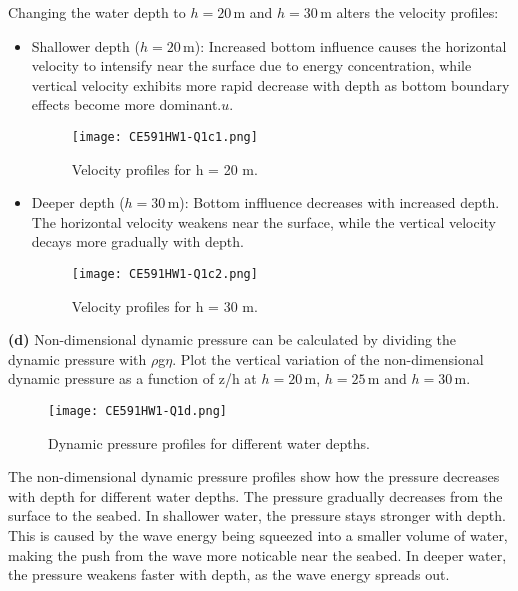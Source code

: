 \documentclass[a4paper]{article}
\begin{document}
Changing the water depth to \( h = 20 \, \text{m} \) and \( h = 30 \, \text{m} \) alters the velocity profiles:  

\begin{itemize}  
    \item {Shallower depth (\( h = 20 \, \text{m} \))}: Increased bottom influence causes the horizontal velocity to intensify near the surface due to energy concentration, while vertical velocity exhibits more rapid decrease with depth as bottom boundary effects become more dominant.\( u \). 
    \begin{figure}[H]
        \centering
        \texttt{[image: CE591HW1-Q1c1.png]}
        \caption{\small Velocity profiles for h = 20 m.}
        \label{fig:plot2c_1}
    \end{figure} 
    \item {Deeper depth (\( h = 30 \, \text{m} \))}: Bottom inffluence decreases with increased depth. The horizontal velocity weakens near the surface, while the vertical velocity decays more gradually with depth. 
    \begin{figure}[H]
        \centering
        \texttt{[image: CE591HW1-Q1c2.png]}
        \caption{\small Velocity profiles for h = 30 m.}
        \label{fig:plot2c_2}
    \end{figure} 
\end{itemize}  
\vspace{0.5cm}

\textbf{(d)} Non-dimensional dynamic pressure can be calculated by dividing the dynamic pressure with $\rho$g$\eta$. Plot the vertical variation of the non-dimensional dynamic pressure as a function of z/h at \( h = 20 \, \text{m} \), \( h = 25 \, \text{m} \) and \( h = 30 \, \text{m} \).
\vspace{0.3cm}

\begin{figure}[H]
    \centering
    \texttt{[image: CE591HW1-Q1d.png]}
    \caption{\small Dynamic pressure profiles for different water depths.}
    \label{fig:plot2d}
\end{figure} 
\vspace{0.3cm}

The non-dimensional dynamic pressure profiles show how the pressure decreases with depth for different water depths. The pressure gradually decreases from the surface to the seabed. In shallower water, the pressure stays stronger with depth. This is caused by the wave energy being squeezed into a smaller volume of water, making the push from the wave more noticable near the seabed. In deeper water, the pressure weakens faster with depth, as the wave energy spreads out.
\vspace{0.5cm}
\end{document}
